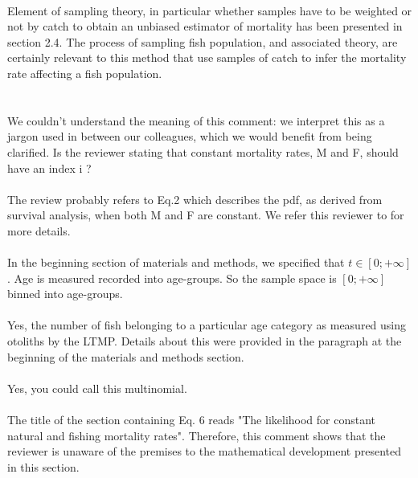 \documentclass[11pt]{article}
\begin{document}
\begin{spacing}{1.2}
{ \\
Element of sampling theory, in particular whether samples have to be weighted or not by catch to obtain an unbiased estimator of mortality has been presented in section 2.4. The process of sampling fish population, and associated theory, are certainly relevant to this method that use samples of catch to infer the mortality rate affecting a fish population. \\

 \\

\\
We couldn't understand the meaning of this comment: we interpret this as a jargon used in between our colleagues, which we would benefit from being clarified. Is the reviewer stating that constant mortality rates, M and F, should have an index i ?\\

\\
The review probably refers to Eq.2 which describes the pdf, as derived from survival analysis, when both M and F are constant. We refer this reviewer to \cite{cox84b} for more details.\\

 \\
In the beginning section of materials and methods, we specified that $t \in [0;+\infty]$. Age is measured recorded into age-groups. So the sample space is $[0;+\infty]$ binned into age-groups.\\

\\
Yes, the number of fish belonging to a particular age category as measured using otoliths by the LTMP. Details about this were provided in the paragraph at the beginning of the materials and methods section.\\

\\
Yes, you could call this multinomial. \\

 \\
The title of the section containing Eq. 6 reads "The likelihood for constant natural and fishing mortality rates". Therefore, this comment shows that the reviewer is unaware of the premises to the mathematical development presented in this section. \\

}
\end{spacing}
\end{document}
